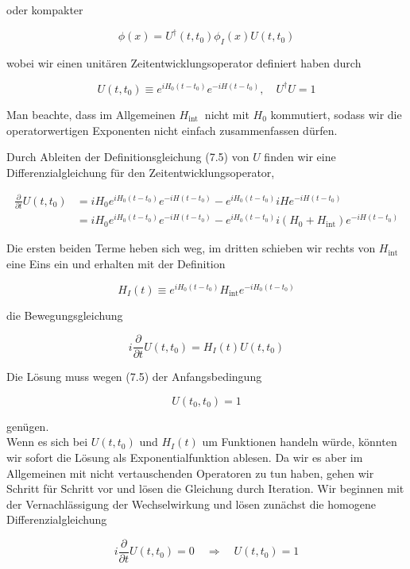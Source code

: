 \documentclass[10pt, letterpaper]{article}
\begin{document}
oder kompakter

$$
\phi(x)=U^{\dagger}\left(t, t_{0}\right) \phi_{I}(x) U\left(t, t_{0}\right)
$$

wobei wir einen unitären Zeitentwicklungsoperator definiert haben durch

$$
U\left(t, t_{0}\right) \equiv e^{i H_{0}\left(t-t_{0}\right)} e^{-i H\left(t-t_{0}\right)}, \quad U^{\dagger} U=1
$$

Man beachte, dass im Allgemeinen $H_{\text {int }}$ nicht mit $H_{0}$ kommutiert, sodass wir die operatorwertigen Exponenten nicht einfach zusammenfassen dürfen.

Durch Ableiten der Definitionsgleichung (7.5) von $U$ finden wir eine Differenzialgleichung für den Zeitentwicklungsoperator,

$$
\begin{aligned}
\frac{\partial}{\partial t} U\left(t, t_{0}\right) & =i H_{0} e^{i H_{0}\left(t-t_{0}\right)} e^{-i H\left(t-t_{0}\right)}-e^{i H_{0}\left(t-t_{0}\right)} i H e^{-i H\left(t-t_{0}\right)} \\
& =i H_{0} e^{i H_{0}\left(t-t_{0}\right)} e^{-i H\left(t-t_{0}\right)}-e^{i H_{0}\left(t-t_{0}\right)} i\left(H_{0}+H_{\mathrm{int}}\right) e^{-i H\left(t-t_{0}\right)}
\end{aligned}
$$

Die ersten beiden Terme heben sich weg, im dritten schieben wir rechts von $H_{\text {int }}$ eine Eins ein und erhalten mit der Definition

$$
H_{I}(t) \equiv e^{i H_{0}\left(t-t_{0}\right)} H_{\mathrm{int}} e^{-i H_{0}\left(t-t_{0}\right)}
$$

die Bewegungsgleichung

$$
i \frac{\partial}{\partial t} U\left(t, t_{0}\right)=H_{I}(t) U\left(t, t_{0}\right)
$$

Die Lösung muss wegen (7.5) der Anfangsbedingung

$$
U\left(t_{0}, t_{0}\right)=1
$$

genügen.\\
Wenn es sich bei $U\left(t, t_{0}\right)$ und $H_{I}(t)$ um Funktionen handeln würde, könnten wir sofort die Lösung als Exponentialfunktion ablesen. Da wir es aber im Allgemeinen mit nicht vertauschenden Operatoren zu tun haben, gehen wir Schritt für Schritt vor und lösen die Gleichung durch Iteration. Wir beginnen mit der Vernachlässigung der Wechselwirkung und lösen zunächst die homogene Differenzialgleichung

$$
i \frac{\partial}{\partial t} U\left(t, t_{0}\right)=0 \quad \Rightarrow \quad U\left(t, t_{0}\right)=1
$$
\end{document}
